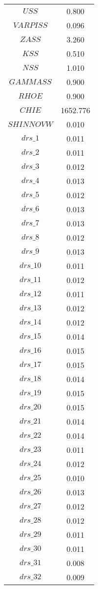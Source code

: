 \begin{center}
\begin{longtable}{cc}
$USS$ 	 & 	 0.800 \\
$VARPISS$ 	 & 	 0.096 \\
$ZASS$ 	 & 	 3.260 \\
$KSS$ 	 & 	 0.510 \\
$NSS$ 	 & 	 1.010 \\
$GAMMASS$ 	 & 	 0.900 \\
$RHOE$ 	 & 	 0.900 \\
$CHIE$ 	 & 	 1652.776 \\
$SHINNOVW$ 	 & 	 0.010 \\
$drs\_1$ 	 & 	 0.011 \\
$drs\_2$ 	 & 	 0.011 \\
$drs\_3$ 	 & 	 0.012 \\
$drs\_4$ 	 & 	 0.013 \\
$drs\_5$ 	 & 	 0.012 \\
$drs\_6$ 	 & 	 0.013 \\
$drs\_7$ 	 & 	 0.013 \\
$drs\_8$ 	 & 	 0.012 \\
$drs\_9$ 	 & 	 0.013 \\
$drs\_10$ 	 & 	 0.011 \\
$drs\_11$ 	 & 	 0.012 \\
$drs\_12$ 	 & 	 0.011 \\
$drs\_13$ 	 & 	 0.012 \\
$drs\_14$ 	 & 	 0.012 \\
$drs\_15$ 	 & 	 0.014 \\
$drs\_16$ 	 & 	 0.015 \\
$drs\_17$ 	 & 	 0.015 \\
$drs\_18$ 	 & 	 0.014 \\
$drs\_19$ 	 & 	 0.015 \\
$drs\_20$ 	 & 	 0.015 \\
$drs\_21$ 	 & 	 0.014 \\
$drs\_22$ 	 & 	 0.014 \\
$drs\_23$ 	 & 	 0.011 \\
$drs\_24$ 	 & 	 0.012 \\
$drs\_25$ 	 & 	 0.010 \\
$drs\_26$ 	 & 	 0.013 \\
$drs\_27$ 	 & 	 0.012 \\
$drs\_28$ 	 & 	 0.012 \\
$drs\_29$ 	 & 	 0.011 \\
$drs\_30$ 	 & 	 0.011 \\
$drs\_31$ 	 & 	 0.008 \\
$drs\_32$ 	 & 	 0.009 \\

\end{longtable}
\end{center}
